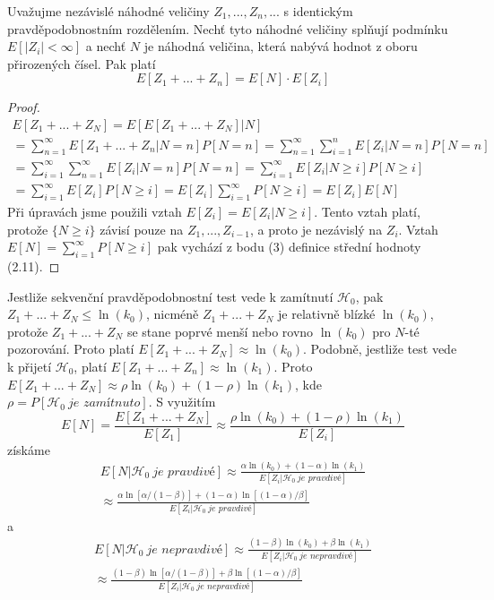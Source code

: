 \begin{theorem}
Uvažujme nezávislé náhodné veličiny $Z_1, ..., Z_n, ...$ s identickým pravděpodobnostním rozdělením. Nechť tyto náhodné veličiny splňují podmínku $E[|Z_i| < \infty]$ a nechť $N$ je náhodná veličina, která nabývá hodnot z oboru přirozených čísel. Pak platí
\begin{equation*}
E[Z_1 + ... + Z_n] = E[N] \cdot E[Z_i]
\end{equation*}
\end{theorem}

\begin{proof}
\begin{multline*}
E[Z_1 + ... + Z_N] = E[E[Z_1 + ... + Z_N] | N]\\
= \sum_{n = 1}^{\infty} E[Z_1 + ... + Z_n| N = n] P[N = n] = \sum_{n = 1}^{\infty} \sum_{i = 1}^n E[Z_i|N = n]P[N = n]\\
= \sum_{i = 1}^{\infty} \sum_{n = 1}^{\infty} E[Z_i|N = n]P[N = n] = \sum_{i = 1}^{\infty} E[Z_i|N \ge i]P[N \ge i]\\
= \sum_{i = 1}^{\infty}E[Z_i]P[N \ge i] = E[Z_i]\sum_{i = 1}^{\infty}P[N \ge i] = E[Z_i] E[N]
\end{multline*}
Při úpravách jsme použili vztah $E[Z_i] = E[Z_i|N \ge i]$. Tento vztah platí, protože $\{N \ge i\}$ závisí pouze na $Z_1, ..., Z_{i - 1}$, a proto je nezávislý na $Z_i$. Vztah $E[N] = \sum_{i = 1}^{\infty}P[N \ge i]$ pak vychází z bodu (3) definice střední hodnoty (2.11).
\end{proof}

Jestliže sekvenční pravděpodobnostní test vede k zamítnutí $\mathscr{H}_0$, pak $Z_1 + ... + Z_N \le \ln(k_0)$, nicméně $Z_1 + ... + Z_N$ je relativně blízké $\ln(k_0)$, protože $Z_1 + ... + Z_N$ se stane poprvé menší nebo rovno $\ln(k_0)$ pro $N$-té pozorování. Proto platí $E[Z_1 + ... + Z_N] \approx \ln(k_0)$. Podobně, jestliže test vede k přijetí $\mathscr{H}_0$, platí $E[Z_1 + ... + Z_n] \approx \ln(k_1)$. Proto $E[Z_1 + ... + Z_N] \approx \rho \ln(k_0) + (1 - \rho)\ln(k_1)$, kde $\rho = P[\mathscr{H}_0 ~ \textit{je zamítnuto}]$. S využitím
\begin{equation*}
E[N] = \frac{E[Z_1 + ... + Z_N]}{E[Z_1]} \approx \frac{\rho \ln(k_0) + (1 - \rho)\ln(k_1)}{E[Z_i]}
\end{equation*}
získáme
\begin{multline}
E[N | \mathscr{H}_0 ~ \textit{je pravdivé}] \approx \frac{\alpha \ln(k_0) + (1 - \alpha)\ln(k_1)}{E[Z_i|\mathscr{H}_0 ~ \textit{je pravdivé}]}\\
\approx \frac{\alpha \ln[\alpha / (1 - \beta)] + (1 - \alpha)\ln[(1 - \alpha) / \beta]}{E[Z_i | \mathscr{H}_0 ~ \textit{je pravdivé}]}
\end{multline}
a
\begin{multline}
E[N | \mathscr{H}_0 ~ \textit{je nepravdivé}] \approx \frac{(1 - \beta) \ln(k_0) + \beta \ln(k_1)}{E[Z_i|\mathscr{H}_0 ~ \textit{je nepravdivé}]}\\
\approx \frac{(1 - \beta) \ln[\alpha / (1 - \beta)] + \beta \ln[(1 - \alpha) / \beta]}{E[Z_i | \mathscr{H}_0 ~ \textit{je nepravdivé}]}
\end{multline}

